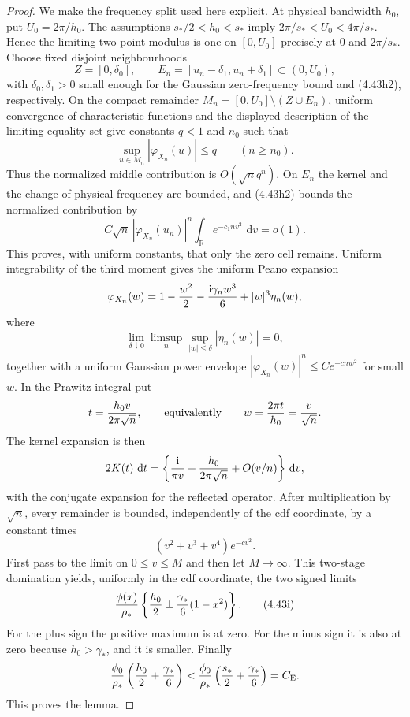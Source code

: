 \documentclass[11pt,a4paper]{article}
\numberwithin{equation}{section}
\theoremstyle{definition}
\theoremstyle{remark}
\newcommand{\ii}{\mathrm i}
\newcommand{\dd}{\,\mathrm d}
\newcommand{\CE}{C_{\mathrm E}}
\begin{document}
\begin{proof}
We make the frequency split used here explicit.  At physical bandwidth
$h_0$, put $U_0=2\pi/h_0$.  The assumptions $s_*/2<h_0<s_*$ imply
$2\pi/s_*<U_0<4\pi/s_*$.  Hence the limiting two-point modulus is one on
$[0,U_0]$ precisely at $0$ and $2\pi/s_*$.  Choose fixed disjoint
neighbourhoods
\[
 Z=[0,\delta_0],\qquad
 E_n=[u_n-\delta_1,u_n+\delta_1]\subset(0,U_0),
\]
with $\delta_0,\delta_1>0$ small enough for the Gaussian zero-frequency
bound and (4.43h2), respectively.  On the compact remainder
$M_n=[0,U_0]\setminus(Z\cup E_n)$, uniform convergence of characteristic
functions and the displayed description of the limiting equality set
give constants $q<1$ and $n_0$ such that
\[
             \sup_{u\in M_n}|\varphi_{X_n}(u)|\le q
             \qquad(n\ge n_0).                       \tag{4.43h3}
\]
Thus the normalized middle contribution is $O(\sqrt n q^n)$.  On $E_n$
the kernel and the change of physical frequency are bounded, and
(4.43h2) bounds the normalized contribution by
\[
 C\sqrt n\,|\varphi_{X_n}(u_n)|^n
       \int_\mathbb R e^{-c_1nv^2}\,\dd v=o(1).       \tag{4.43h4}
\]
This proves, with uniform constants, that only the zero cell remains.
Uniform integrability of the third moment gives the uniform Peano expansion
 \[
  \varphi_{X_n}(w)=1-{w^2\over2}-{\ii\gamma_nw^3\over6}
                          +|w|^3\eta_n(w),
 \]
 where
 \[
  \lim_{\delta\downarrow0}\limsup_n
       \sup_{|w|\le\delta}|\eta_n(w)|=0,
 \]
 together with a uniform Gaussian power envelope
 $|\varphi_{X_n}(w)|^n\le Ce^{-cnw^2}$ for small $w$.  In the Prawitz
 integral put
 \[
  t={h_0v\over2\pi\sqrt n},
  \qquad\text{equivalently}\qquad
  w={2\pi t\over h_0}={v\over\sqrt n}.
 \]
 The kernel expansion is then
 \[
  2K(t)\,\dd t=
  \left\{{\ii\over\pi v}+{h_0\over2\pi\sqrt n}
                    +O(v/n)\right\}\dd v,
 \]
 with the conjugate expansion for the reflected operator.  After
 multiplication by $\sqrt n$, every remainder is bounded, independently
 of the cdf coordinate, by a constant times
 \[
             (v^2+v^3+v^4)e^{-cv^2}.
 \]
 First pass to the limit on $0\le v\le M$ and then let $M\to\infty$.
 This two-stage domination yields, uniformly in the cdf coordinate, the
 two signed limits
\[
 {\phi(x)\over\rho_*}
 \left\{{h_0\over2}\mathbin\pm
             {\gamma_*\over6}(1-x^2)\right\}.        \tag{4.43i}
\]
For the plus sign the positive maximum is at zero.  For the minus sign it
is also at zero because $h_0>\gamma_*$, and it is smaller.  Finally
\[
 {\phi_0\over\rho_*}
 \left({h_0\over2}+{\gamma_*\over6}\right)
 <{\phi_0\over\rho_*}
 \left({s_*\over2}+{\gamma_*\over6}\right)=\CE.
\]
This proves the lemma.
\end{proof}
\end{document}
